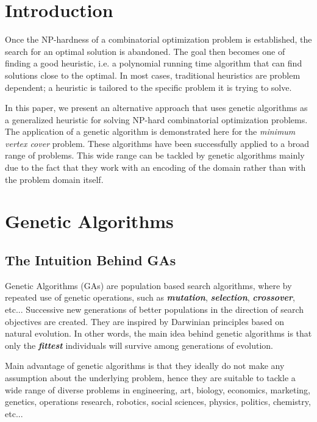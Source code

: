 \documentclass[12pt]{article}
\newcommand{\textem}[1]{\textbf{\emph{#1}}}
\begin{document}
\pagebreak



\section{Introduction}
Once the NP-hardness of a combinatorial optimization
problem is established, the search for an optimal solution
is abandoned. The goal then becomes one of finding a
good heuristic, i.e. a polynomial running time algorithm
that can find solutions close to the optimal. In most cases,
traditional heuristics are problem dependent; a heuristic is
tailored to the specific problem it is trying to solve.

In this paper, we present an alternative approach that
uses genetic algorithms as a generalized heuristic for solving NP-hard combinatorial optimization problems. The
application of a genetic algorithm is demonstrated here for
the \textit{minimum vertex cover} problem. These algorithms
have been successfully applied to a broad range of problems. This wide range can be tackled by genetic algorithms
mainly due to the fact that they work with an encoding of
the domain rather than with the problem domain itself.


\section{Genetic Algorithms}
\subsection{The Intuition Behind GAs}
Genetic Algorithms (GAs) \cite{coley, goldberg} are population based
search algorithms, where by repeated use of genetic operations,
such as \textem{mutation}, \textem{selection}, \textem{crossover}, etc...
Successive new generations of better populations in the direction of
search objectives are created.
They are inspired by Darwinian principles
based on natural evolution.
In other words, the main idea behind genetic
algorithms is that only the \textem{fittest} individuals will survive
among generations of evolution.

Main advantage of genetic algorithms is that they ideally do not make
any assumption about the underlying problem, hence they are suitable to tackle
a wide range of diverse problems in
engineering, art, biology, economics, marketing, genetics,
operations research, robotics, social sciences, physics, politics, chemistry,
etc... \cite[ch.~6]{coley}
\end{document}
